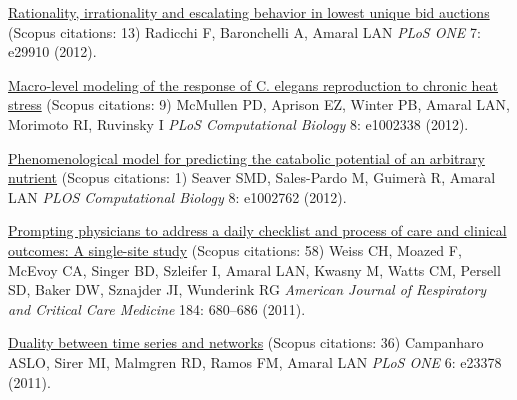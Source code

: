 \NumberedItem{\makebox[0.8cm][r]{[96]}}
\href{/people/amaral/rationality-irrationality-and-escalating-behavior-lowest-unique-bid-auctions}
{Rationality, irrationality and escalating behavior in lowest unique bid auctions}
    (Scopus citations: 13)
\newline
Radicchi F, Baronchelli A, Amaral LAN
\newline
\textit{PLoS ONE}
    7:
e29910 (2012).
\newline
\Gap
~
\Gap

\NumberedItem{\makebox[0.8cm][r]{[95]}}
\href{/people/amaral/macro-level-modeling-response-_c-elegans_-reproduction-chronic-heat-stress}
{Macro-level modeling of the response of C. elegans reproduction to chronic heat stress}
    (Scopus citations: 9)
\newline
McMullen PD, Aprison EZ, Winter PB, Amaral LAN, Morimoto RI, Ruvinsky I
\newline
\textit{PLoS Computational Biology}
    8:
e1002338 (2012).
\newline
\Gap
~
\Gap

\NumberedItem{\makebox[0.8cm][r]{[94]}}
\href{/people/amaral/phenomenological-model-predicting-catabolic-potential-arbitrary-nutrient}
{Phenomenological model for predicting the catabolic potential of an arbitrary nutrient}
    (Scopus citations: 1)
\newline
Seaver SMD, Sales-Pardo M, Guimer\`a R, Amaral LAN
\newline
\textit{PLOS Computational Biology}
    8:
e1002762 (2012).
\newline
\Gap
~
\Gap

\NumberedItem{\makebox[0.8cm][r]{[93]}}
\href{/people/amaral/prompting-physicians-address-daily-checklist-and-process-care-and-clinical-outcomes-single-site-study}
{Prompting physicians to address a daily checklist and process of care and clinical outcomes: A single-site study}
    (Scopus citations: 58)
\newline
Weiss CH, Moazed F, McEvoy CA, Singer BD, Szleifer I, Amaral LAN, Kwasny M, Watts CM, Persell SD, Baker DW, Sznajder JI, Wunderink RG
\newline
\textit{American Journal of Respiratory and Critical Care Medicine}
    184:
680--686 (2011).
\newline
\Gap
~
\Gap

\NumberedItem{\makebox[0.8cm][r]{[92]}}
\href{/people/amaral/duality-between-time-series-and-networks}
{Duality between time series and networks}
    (Scopus citations: 36)
\newline
Campanharo ASLO, Sirer MI, Malmgren RD, Ramos FM, Amaral LAN
\newline
\textit{PLoS ONE}
    6:
e23378 (2011).
\newline
\Gap
~
\Gap

